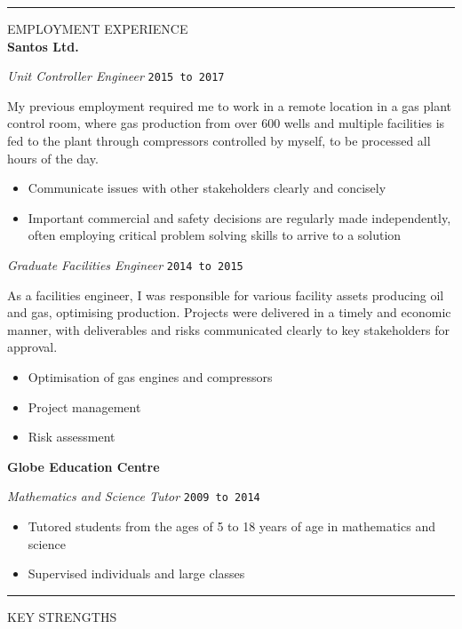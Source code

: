 \documentclass{article}
\newcommand{\HRule}{\rule{\linewidth}{0.5mm}}
\begin{document}

\HRule

{\footnotesize EMPLOYMENT EXPERIENCE}
\\

\textbf{\large Santos Ltd.}

\emph{Unit Controller Engineer} \hfill \texttt{2015 to 2017}

{\footnotesize
My previous employment required me to work in a remote location in a gas plant control room, where gas production from over 600 wells and multiple facilities is fed to the plant through compressors controlled by myself, to be processed all hours of the day.

\begin{itemize}
\item Communicate issues with other stakeholders clearly and concisely
\item Important commercial and safety decisions are regularly made independently, often employing critical problem solving skills to arrive to a solution
\end{itemize}
}
\emph{Graduate Facilities Engineer} \hfill \texttt{2014 to 2015}

{\footnotesize
As a facilities engineer, I was responsible for various facility assets producing oil and gas, optimising production. Projects were delivered in a timely and economic manner, with deliverables and risks communicated clearly to key stakeholders for approval.

\begin{itemize}
\item Optimisation of gas engines and compressors
\item Project management
\item Risk assessment \\
\end{itemize} }


\textbf{\large Globe Education Centre}

\emph{Mathematics and Science Tutor} \hfill \texttt{2009 to 2014}
{\footnotesize
\begin{itemize}
\item Tutored students from the ages of 5 to 18 years of age in mathematics and science
\item Supervised individuals and large classes
\end{itemize} }
\HRule


{\footnotesize KEY STRENGTHS}
\end{document}
